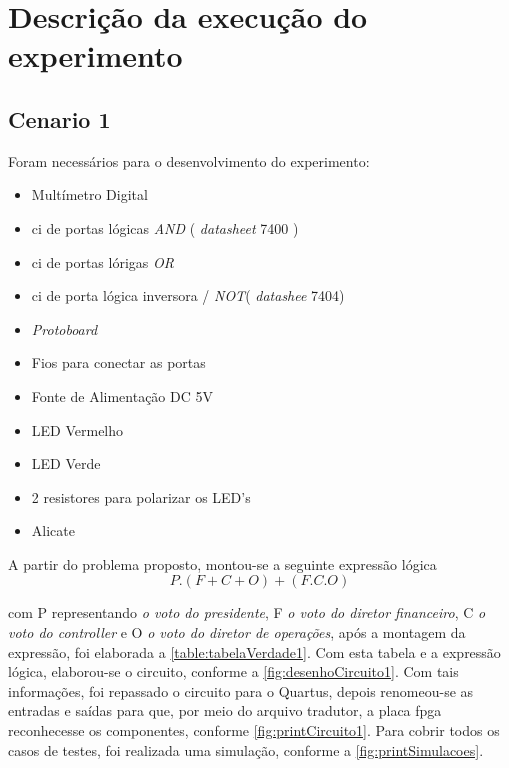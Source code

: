 
\chapter{Descrição da execução do experimento}

\section{Cenario 1}

	Foram necessários para o desenvolvimento do experimento:
	\begin{itemize}
		\item Multímetro Digital
		\item \ac{ci} de portas lógicas \textit{AND} ( \textit{datasheet} 7400 )
		\item \ac{ci} de portas lórigas \textit{OR}
		\item \ac{ci} de porta lógica inversora / \textit{NOT}( \textit{datashee} 7404)
		\item \textit{Protoboard}
		\item Fios para conectar as portas
		\item Fonte de Alimentação DC 5V
		\item LED Vermelho
		\item LED Verde
		\item 2 resistores para polarizar os LED’s
		\item Alicate
	\end{itemize}

	A partir do problema proposto, montou-se a seguinte expressão lógica
	$$ P . ( F + C + O) + (F . C . O)$$

	com P representando \textit{o voto do presidente}, F
	\textit{o voto do diretor financeiro}, C
	\textit{o voto do controller} e O \textit{o voto do diretor de operações}, após a
	montagem da expressão, foi elaborada a \autoref{table:tabelaVerdade1}. Com esta tabela e a expressão lógica,
	elaborou-se o circuito, conforme a \autoref{fig:desenhoCircuito1}. Com tais informações, foi repassado o circuito
	para o Quartus, depois renomeou-se as entradas e saídas para que, por meio do arquivo tradutor, a placa
	\ac{fpga} reconhecesse os componentes, conforme \autoref{fig:printCircuito1}.
	Para cobrir todos os casos de testes, foi realizada uma simulação, conforme a \autoref{fig:printSimulacoes}.

